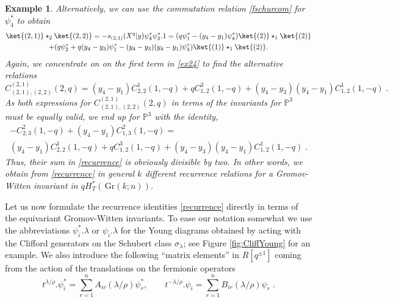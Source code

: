 \documentclass[12pt]{amsart}
\newcommand{\Gr}{\,\mathrm{Gr}}
\newcommand{\mb}[1]{\mathbb{#1}}
\newcommand{\ring}{R}
\newtheorem{example}[prop]{Example}
\numberwithin{equation}{section}
\numberwithin{figure}{section}
\begin{document}
\begin{example}
        \noindent Alternatively, we can use the commutation relation \eqref{fschurcom} for $\psi^*_4$ to obtain
        \begin{multline*}
            \ket{(2,1)} \star_2 \ket{(2,2)} = 
            -s_{(2,1)}(X^q|y) \psi^*_4 \psi^*_3.1= 
            (q \psi^*_1 - (y_4 - y_1)\psi^*_4) \ket{(2)} \star_{1} \ket{(2)}\\+ (q \psi^*_2 + q (y_4 - y_3) \psi^*_1 - (y_4 - y_3)(y_4 - y_1)\psi^*_4) \ket{(1)} \star_1 \ket{(2)}.
        \end{multline*}
        Again, we concentrate on on the first term in \eqref{ex24} to find the alternative relations
        \[
        C_{(2,1),(2,2)}^{(2,1)}(2, q) = (y_4 - y_1)C_{2,2}^1(1,-q) + q C_{1,2}^3(1,-q) + (y_4 - y_3)(y_4 - y_1)C_{1,2}^1(1,-q)\;.
        \]
        As both expressions for $C_{(2,1),(2,2)}^{(2,1)}(2, q)$ in terms of the invariants for $\mb{P}^3$ must be equally valid, we end up for $\mb{P}^3$ with the identity,
        \begin{multline*}
         -C_{2,3}^2(1, -q) + (y_4 - y_1) C_{1,3}^{2}(1, -q)=\\
            (y_4 - y_1)C_{2,2}^1(1,-q) + q C_{1,2}^3(1,-q) + (y_4 - y_3)(y_4 - y_1)C_{1,2}^1(1,-q)\;.
        \end{multline*}
        Thus, their sum in \eqref{recurrence} is obviously divisible by two. In other words, we obtain from \eqref{recurrence} in general $k$ different recurrence relations for a Gromov-Witten invariant in $qH^*_T(\Gr(k;n))$.
    \end{example}
    Let us now formulate the recurrence identities \eqref{recurrence} directly in terms of the equivariant Gromov-Witten invariants. To ease our notation somewhat we use the abbreviations $\psi^*_i . \lambda$ or $\psi_i . \lambda$ for the Young diagrams obtained by acting with the Clifford generators on the Schubert class $\sigma_\lambda$; see Figure \ref{fig:CliffYoung} for an example. We also introduce the following ``matrix elements'' in $\ring[q^{\pm1}]$ coming from the action of the translations on the fermionic operators
    \begin{equation}\label{matrixcoef}
        t^{\lambda/\rho}.\psi^*_i = \sum\limits_{r = 1}^n A_{ir}(\lambda/\rho) \psi^*_r, \qquad t^{-\lambda/\rho}.\psi_i = \sum\limits_{r = 1}^n B_{ir}(\lambda/\rho) \psi_r\;.
    \end{equation}
\end{document}
